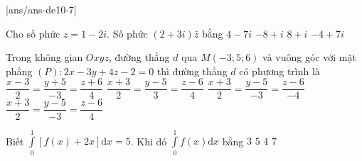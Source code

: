 
\begin{name}
	{\tenchude}
	{\tendethi}
	{\tentruong}
	{\thoigian}
\end{name}
[ans/ans-de10-7]

\begin{ex}%
Cho số phức $z=1-2 i$. Số phức $(2+3 i) \bar{z}$ bằng
\choice
{$4-7 i$}
{$-8+i$}
{$8+i$}
{\True $-4+7 i$}

\end{ex}
\begin{ex}%
Trong không gian $O x y z$, đường thẳng $d$ qua $M(-3; 5; 6)$ và vuông góc với mặt phẳng $(P)\colon 2 x-3 y+4 z-2=0$ thì đường thẳng $d$ có phương trình là
\choice
{$\dfrac{x-3}{2}=\dfrac{y+5}{-3}=\dfrac{z+6}{4}$}
{$\dfrac{x+3}{2}=\dfrac{y-5}{3}=\dfrac{z-6}{4}$}
{$\dfrac{x+3}{2}=\dfrac{y-5}{-3}=\dfrac{z-6}{-4}$}
{\True $\dfrac{x+3}{2}=\dfrac{y-5}{-3}=\dfrac{z-6}{4}$}

\end{ex}

\begin{ex}%
Biết $\displaystyle\int\limits_0^1[f(x)+2 x] \mathrm{d} x=5$. Khi đó $\displaystyle\int\limits_0^1 f(x) \mathrm{d} x$ bằng
\choice
{$3$}
{$5$}
{\True $4$}
{$7$}

\end{ex}

